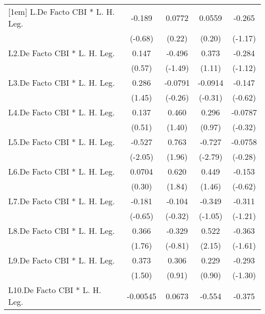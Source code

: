 {\begin{longtable}{l*{4}{c}}
[1em]
L.De Facto CBI * L. H. Leg.&   -0.189         &   0.0772         &   0.0559         &   -0.265         \\
                &  (-0.68)         &   (0.22)         &   (0.20)         &  (-1.17)         \\
[1em]
L2.De Facto CBI * L. H. Leg.&    0.147         &   -0.496         &    0.373         &   -0.284         \\
                &   (0.57)         &  (-1.49)         &   (1.11)         &  (-1.12)         \\
[1em]
L3.De Facto CBI * L. H. Leg.&    0.286         &  -0.0791         &  -0.0914         &   -0.147         \\
                &   (1.45)         &  (-0.26)         &  (-0.31)         &  (-0.62)         \\
[1em]
L4.De Facto CBI * L. H. Leg.&    0.137         &    0.460         &    0.296         &  -0.0787         \\
                &   (0.51)         &   (1.40)         &   (0.97)         &  (-0.32)         \\
[1em]
L5.De Facto CBI * L. H. Leg.&   -0.527\sym{*}  &    0.763         &   -0.727\sym{**} &  -0.0758         \\
                &  (-2.05)         &   (1.96)         &  (-2.79)         &  (-0.28)         \\
[1em]
L6.De Facto CBI * L. H. Leg.&   0.0704         &    0.620         &    0.449         &   -0.153         \\
                &   (0.30)         &   (1.84)         &   (1.46)         &  (-0.62)         \\
[1em]
L7.De Facto CBI * L. H. Leg.&   -0.181         &   -0.104         &   -0.349         &   -0.311         \\
                &  (-0.65)         &  (-0.32)         &  (-1.05)         &  (-1.21)         \\
[1em]
L8.De Facto CBI * L. H. Leg.&    0.366         &   -0.329         &    0.522\sym{*}  &   -0.363         \\
                &   (1.76)         &  (-0.81)         &   (2.15)         &  (-1.61)         \\
[1em]
L9.De Facto CBI * L. H. Leg.&    0.373         &    0.306         &    0.229         &   -0.293         \\
                &   (1.50)         &   (0.91)         &   (0.90)         &  (-1.30)         \\
[1em]
L10.De Facto CBI * L. H. Leg.& -0.00545         &   0.0673         &   -0.554\sym{*}  &   -0.375         \\

\end{longtable}}
